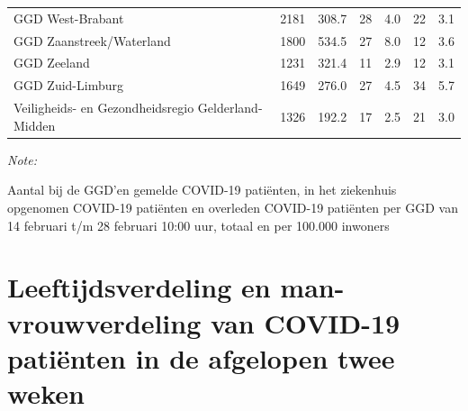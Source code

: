 \documentclass[
  english,
  man,floatsintext]{apa6}
\begin{document}
\begin{table}
\begin{threeparttable}
\begin{tabular}{lrrrrrr}
GGD West-Brabant & 2181 & 308.7 & 28 & 4.0 & 22 & 3.1\\
GGD Zaanstreek/Waterland & 1800 & 534.5 & 27 & 8.0 & 12 & 3.6\\
GGD Zeeland & 1231 & 321.4 & 11 & 2.9 & 12 & 3.1\\
GGD Zuid-Limburg & 1649 & 276.0 & 27 & 4.5 & 34 & 5.7\\
Veiligheids- en Gezondheidsregio Gelderland-Midden & 1326 & 192.2 & 17 & 2.5 & 21 & 3.0\\
\bottomrule
\end{tabular}
\begin{tablenotes}
\item \textit{Note: } 
\item Aantal bij de GGD’en gemelde COVID-19 patiënten, in het ziekenhuis opgenomen COVID-19 patiënten en overleden COVID-19 patiënten per GGD van 14 februari t/m 28 februari 10:00 uur, totaal en per 100.000 inwoners
\end{tablenotes}
\end{threeparttable}
\endgroup{}
\end{table}

\newpage

\hypertarget{leeftijdsverdeling-en-man-vrouwverdeling-van-covid-19-patiuxebnten-in-de-afgelopen-twee-weken}{%
\section{Leeftijdsverdeling en man-vrouwverdeling van COVID-19 patiënten in de afgelopen twee weken}\label{leeftijdsverdeling-en-man-vrouwverdeling-van-covid-19-patiuxebnten-in-de-afgelopen-twee-weken}}
\end{document}
